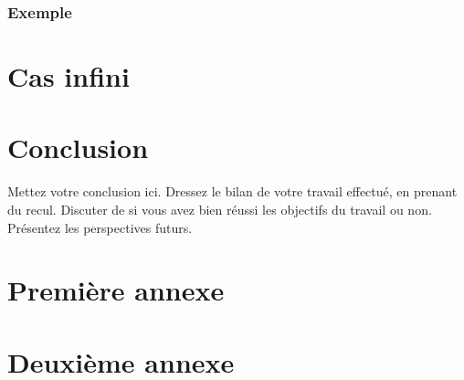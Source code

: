 \documentclass[12pt,a4paper,oneside, titlepage]{report}
\begin{document}
\subsection*{Exemple}

\chapter{Cas infini}

\chapter*{Conclusion}
\renewcommand{\leftmark}{CONCLUSION}

Mettez votre conclusion ici.  Dressez le bilan de votre travail effectué, en prenant du recul. Discuter de si vous avez bien réussi les objectifs du travail ou non. Présentez les perspectives futurs.






\newpage
\appendix
{}

\chapter{Premi\`ere annexe}
\renewcommand{\leftmark}{ANNEXE \thechapter.~~Premi\`ere annexe}
\label{annexe1}

\chapter{Deuxi\`eme annexe}
\renewcommand{\leftmark}{ANNEXE \thechapter.~~Deuxi\`eme annexe}
\label{annexe2}

\end{document}
